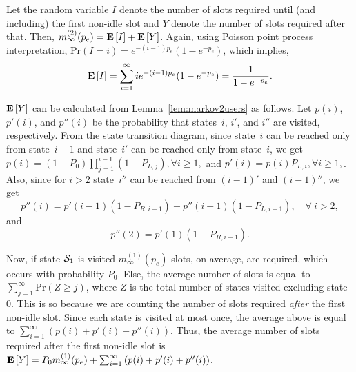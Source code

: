 \documentclass[12pt,draftcls,peerreview, onecolumn]{IEEEtran}
\newcommand{\brac}[1]{\left({#1}\right)}
\newcommand{\expect}[1]{{\bf E}\left[{#1}\right]}
\newcommand{\prob}[1]{\text{Pr}\brac{#1}}
\newcommand{\aveslotsQ}[2]{m_{#1}^{(#2)}}
\newcommand{\success}{{\cal S}}
\newcommand{\PLi}[1]{P_{L,#1}}
\newcommand{\PRi}[1]{P_{R,#1}}
\begin{document}
 Let the random variable $I$ denote the number of slots required until (and including) the first non-idle slot and $Y$ denote the number of slots required after that. Then, $\aveslotsQ{\infty}{2}(p_e)=\expect{I}+\expect{Y}$. Again, using Poisson point process interpretation,
   $\prob{I=i} = e^{-(i-1)p_e}(1-e^{-p_e})$, which implies,
\begin{equation}
\expect{I} = \sum_{i=1}^\infty ie^{-(i-1)p_e}(1-e^{-p_e}) =
  \frac{1}{1-e^{-p_e}}. 
\end{equation}

$\expect{Y}$ can be calculated from Lemma~\ref{lem:markov2users} as
follows.  Let $p(i)$, $p'(i)$, and $p''(i)$ be the probability that
states~$i$, $i'$, and $i''$ are visited, respectively. From the state
transition diagram, since state~$i$ can be reached only from
state~$i-1$ and state~$i'$ can be reached only from state~$i$, we get
$ p(i)= (1-P_0)\prod_{j=1}^{i-1} (1-\PLi{j}),\forall i\ge1,$ and $
p'(i)=p(i)\PLi{i} ,\forall i\ge1,$.  Also, since for $i>2$ state~$i''$
can be reached from $(i-1)'$ and $(i-1)''$, we get
\begin{equation}
p''(i) = p'(i-1)(1-\PRi{i-1}) + p''(i-1)(1-\PLi{i-1}),\quad\forall~i > 2,
\end{equation}
and  
\begin{equation}
p''(2)=p'(1)(1-\PRi{i-1}).
\end{equation}

Now, if state $\success_1$ is visited $\aveslotsQ{\infty}{1}(p_e)$
slots, on average, are required, which occurs with probability $P_0$.
Else, the average number of slots is equal to
$\sum_{j=1}^{\infty}\prob{Z\ge j}$, where $Z$ is the total number of
states visited excluding state~$0$. This is so because we are counting
the number of slots required {\it after} the first non-idle slot.
Since each state is visited at most once, the average above is equal
to $\sum_{i=1}^{\infty}\left(p(i)+p'(i)+p''(i)\right)$.  Thus, the
average number of slots required after the first non-idle slot is
$\expect{Y} = P_0
\aveslotsQ{\infty}{1}(p_e)+\sum_{i=1}^{\infty}\left(p(i)+p'(i)+p''(i)\right)$.
\end{document}
